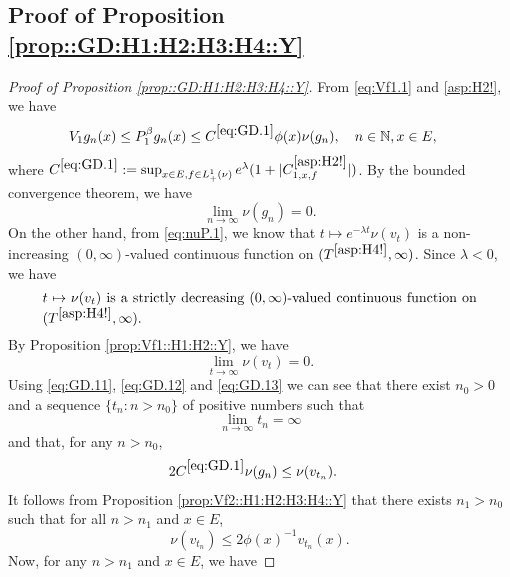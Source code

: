 \documentclass[12pt,a4paper]{amsart}
\numberwithin{equation}{section}
\theoremstyle{plain}
\theoremstyle{definition}
\theoremstyle{remark}
\begin{document}
\subsection{Proof of Proposition \ref{prop::GD:H1:H2:H3:H4::Y}}
\begin{proof}[Proof of Proposition \ref{prop::GD:H1:H2:H3:H4::Y}] \label{sec:GD}
	From \eqref{eq:Vf1.1} and \eqref{asp:H2!}, we have
\begin{align}\label{eq:GD.1}
	&V_1 g_n(x)
	\leq P^\beta_1 g_n(x)
	\leq C^{\eqref{eq:GD.1}} \phi(x) \nu(g_n),
	\quad n \in \mathbb N, x\in E,
\end{align}
	where $C^{\eqref{eq:GD.1}}:= \sup_{x\in E, f\in L_+^1(\nu)}e^{\lambda }(1+|C^{\eqref{asp:H2!}}_{1,x,f}|)$.
	By the bounded convergence theorem, we have
\begin{equation} \label{eq:GD.11}
	\lim_{n\to \infty} \nu(g_n) =0.
\end{equation}
	On the other hand, from \eqref{eq:nuP.1}, we know that $ t\mapsto e^{-\lambda t}\nu(v_t)$ is a non-increasing $(0,\infty)$-valued continuous function on $(T^{\eqref{asp:H4!}},\infty)$.
	Since $\lambda <0$, we have
\begin{equation} \label{eq:GD.12}
\begin{minipage}{0.9\textwidth}
	$ t\mapsto \nu(v_t)$ is a strictly decreasing $(0,\infty)$-valued continuous function on $(T^{\eqref{asp:H4!}},\infty)$.
\end{minipage}
\end{equation}
	By Proposition \ref{prop:Vf1::H1:H2::Y}, we have
\begin{equation} \label{eq:GD.13}
	\lim_{t\to \infty}\nu(v_t) =0.
\end{equation}
	Using \eqref{eq:GD.11}, \eqref{eq:GD.12} and \eqref{eq:GD.13} we can see that there exist $n_0>0$ and a sequence $\{t_n: n>n_0\}$ of positive numbers such that
\begin{equation} \label{eq:GD.14}
	\lim_{n\to \infty} t_n = \infty
\end{equation}
	and that, for any $n>n_0$,
\begin{align} \label{eq:GD.2}& 2C^{\eqref{eq:GD.1}} \nu(g_n) \leq \nu(v_{t_n}). \end{align}
	It follows from Proposition \ref{prop:Vf2::H1:H2:H3:H4::Y} that there exists $n_1 > n_0$ such that for all $n>n_1$ and $x\in E$,
\begin{equation} \label{eq:GD.25}
	\nu(v_{t_n})\leq 2\phi(x)^{-1} v_{t_n}(x).
\end{equation}
	Now, for any $n>n_1$ and $x\in E$, we have

\end{proof}
\end{document}
